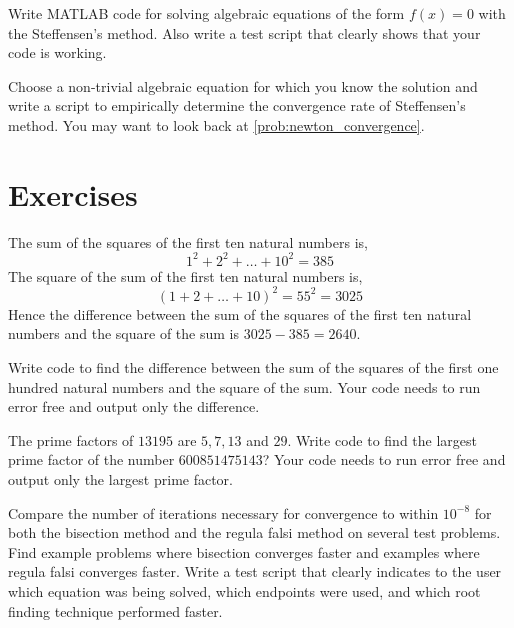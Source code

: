 \begin{problem}
    Write MATLAB code for solving algebraic equations of the form $f(x) = 0$ with the
    Steffensen's method.  Also write a test script that clearly shows that your code is working.
\end{problem}

\begin{problem}
    Choose a non-trivial algebraic equation for which you know the solution and write a
    script to empirically determine the convergence rate of Steffensen's method.  You may want to
    look back at \ref{prob:newton_convergence}.
\end{problem}

\section{Exercises}

\begin{problem}
    The sum of the squares of the first ten natural numbers is,
    \[ 1^2 + 2^2 + \dots + 10^2 = 385 \]
    The square of the sum of the first ten natural numbers is,
    \[ (1 + 2 + \dots + 10)^2 = 55^2 = 3025 \]
    Hence the difference between the sum of the squares of the first ten natural numbers
    and the square of the sum is $3025 - 385 = 2640$.

    Write code to find the difference between the sum of the squares of the first one
    hundred natural numbers and the square of the sum.  Your code needs to run error free
    and output only the difference.  
\end{problem}

\begin{problem}
    The prime factors of $13195$ are $5, 7, 13$ and $29$.  Write
    code to find the largest prime factor of the number $600851475143$? Your code needs to
    run error free and output only the largest prime factor. 
\end{problem}

\begin{problem}
    Compare the number of iterations necessary for convergence to within $10^{-8}$ for
    both the bisection method and the regula falsi method on several test problems. Find
    example problems where bisection converges faster and examples where regula falsi
    converges faster. Write a test script that clearly indicates to the user which
    equation was being solved, which endpoints were used, and which root finding technique
    performed faster.
\end{problem}



